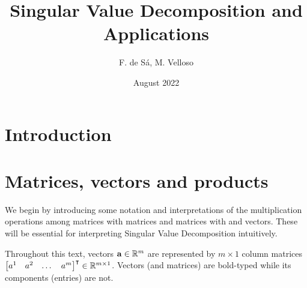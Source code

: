 \documentclass{article}
\title{Singular Value Decomposition and Applications}
\author{F. de Sá, M. Velloso}
\date{August 2022}
\begin{document}
\maketitle

\section{Introduction}
\section{Matrices, vectors and products}

We begin by introducing some notation and interpretations of the multiplication operations among matrices with matrices and matrices with and vectors. These will be essential for interpreting Singular Value Decomposition intuitively. 

Throughout this text, vectors $\vb{a}\in\mathbb{R}^m$ are represented by $m\times 1$ column matrices $\mqty[a^1 & a^2 & \dots & a^m]^{\intercal}\in\mathbb{R}^{m \times 1} $. Vectors (and matrices) are bold-typed while its components (entries) are not. 
\end{document}
